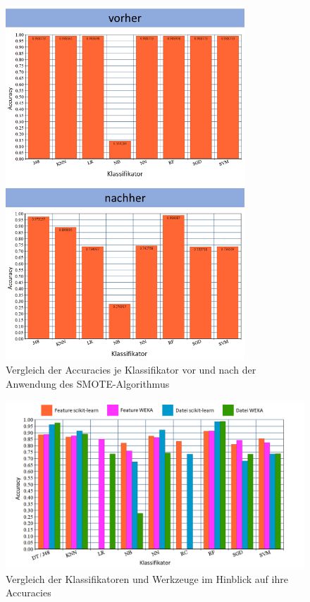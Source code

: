 \begin{figure}[]
    \centering
    \includegraphics[width=0.8\textwidth]{images/smoted}
    \caption{Vergleich der Accuracies je Klassifikator vor und nach der Anwendung des SMOTE-Algorithmus\label{fig:smoted}}
\end{figure}

\begin{figure}[]
    \centering
    \includegraphics[width=\textwidth]{images/Vergleich1}
    \caption{Vergleich der Klassifikatoren und Werkzeuge im Hinblick auf ihre Accuracies\label{fig:vergl1}}
\end{figure}


\cleardoublepage